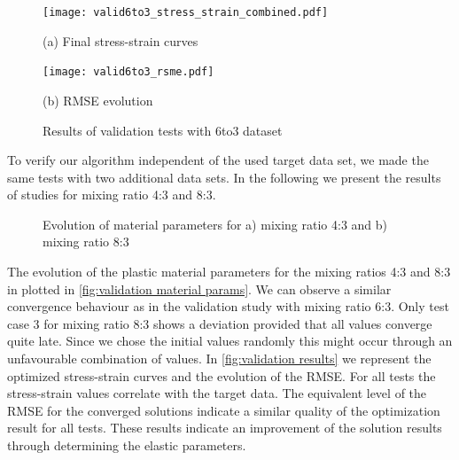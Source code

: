     
    \begin{figure}[H]
        \centering
        \begin{minipage}[t]{0.47\textwidth}
            \centering
            \texttt{[image: valid6to3\_stress\_strain\_combined.pdf]}
            \caption*{(a) Final stress-strain curves}
            \label{fig:validationStressStrain6to3}
        \end{minipage}
        \hfill
        \begin{minipage}[t]{0.47\textwidth}
            \centering
            \texttt{[image: valid6to3\_rsme.pdf]}
            \caption*{(b) RMSE evolution}
            \label{subfigure:validation-rmse-6to3}
        \end{minipage}
        \caption{Results of validation tests with 6to3 dataset}
        \label{fig:validation results 6to3}
    \end{figure}
    


    To verify our algorithm independent of the used target data set, we made the same tests with two additional data sets. In the following we present the results of studies for mixing ratio 4:3 and 8:3. 

    \begin{figure}[H]
        \centering
        \caption{Evolution of material parameters for a) mixing ratio 4:3 and b) mixing ratio 8:3}
        \label{fig:validation material params}
    \end{figure}

    The evolution of the plastic material parameters for the mixing ratios 4:3 and 8:3 in plotted in \autoref{fig:validation material params}. We can observe a similar convergence behaviour as in the validation study with mixing ratio 6:3. Only test case 3 for mixing ratio 8:3 shows a deviation provided that all values converge quite late. Since we chose the initial values randomly this might occur through an unfavourable combination of values. 
    In \autoref{fig:validation results} we represent the optimized stress-strain curves and the evolution of the RMSE. For all tests the stress-strain values correlate with the target data. The equivalent level of the RMSE for the converged solutions indicate a similar quality of the optimization result for all tests. These results indicate an improvement of the solution results through determining the elastic parameters.
     
